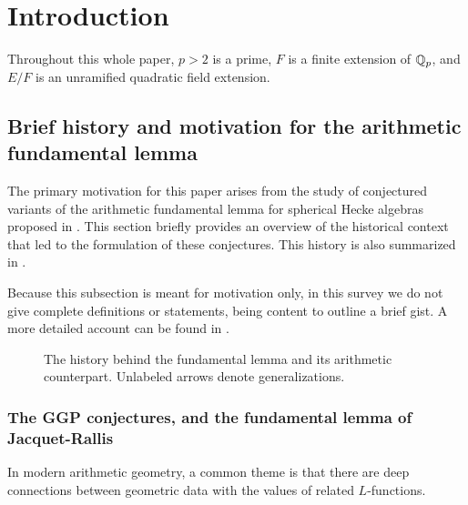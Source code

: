 \section{Introduction}
Throughout this whole paper, $p > 2$ is a prime,
$F$ is a finite extension of $\mathbb Q_p$,
and $E/F$ is an unramified quadratic field extension.

\subsection{Brief history and motivation for the arithmetic fundamental lemma}
The primary motivation for this paper arises from
the study of conjectured variants of the arithmetic fundamental lemma
for spherical Hecke algebras proposed in \cite{ref:AFLspherical}.
This section briefly provides an overview of the historical context
that led to the formulation of these conjectures.
This history is also summarized in .

Because this subsection is meant for motivation only, in this survey we do not give
complete definitions or statements, being content to outline a brief gist.
A more detailed account can be found in \cite{ref:survey}.

\begin{figure}[ht]
  \centering
  \caption{The history behind the fundamental lemma and its arithmetic counterpart.
    Unlabeled arrows denote generalizations.}
  \label{fig:history}
\end{figure}

\subsubsection{The GGP conjectures, and the fundamental lemma of Jacquet-Rallis}
In modern arithmetic geometry, a common theme is that there are deep connections
between geometric data with the values of related $L$-functions.

